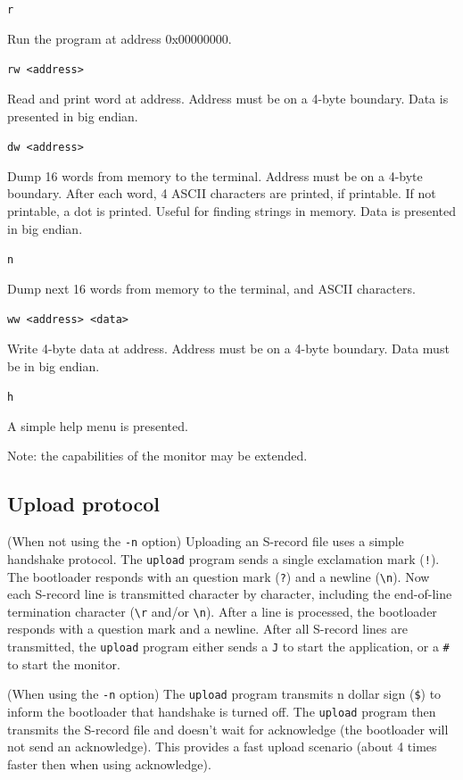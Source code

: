 \documentclass[12pt]{article}
\begin{document}
\lstinline|r|

Run the program at address 0x00000000.

\lstinline|rw <address>|

Read and print word at address. Address must be on a 4-byte boundary. Data is presented in big endian.

\lstinline|dw <address>|

Dump 16 words from memory to the terminal. Address must be on a 4-byte boundary. After each word, 4 ASCII characters are printed, if printable. If not printable, a dot is printed. Useful for finding strings in memory. Data is presented in big endian.

\lstinline|n|

Dump next 16 words from memory to the terminal, and ASCII characters.

\lstinline|ww <address> <data>|

Write 4-byte data at address. Address must be on a 4-byte boundary. Data must be in big endian.

\lstinline|h|

A simple help menu is presented.

Note: the capabilities of the monitor may be extended.

\subsection{Upload protocol}
(When not using the \lstinline|-n| option) Uploading an S-record file uses a simple handshake protocol. The \lstinline|upload| program sends a single exclamation mark (\lstinline|!|). The bootloader responds with an question mark (\lstinline|?|) and a newline (\lstinline|\n|). Now each S-record line is transmitted character by character, including the end-of-line termination character (\lstinline|\r| and/or \lstinline|\n|). After a line is processed, the bootloader responds with a question mark and a newline. After all S-record lines are transmitted, the \lstinline|upload| program either sends a \lstinline|J| to start the application, or a \lstinline|#| to start the monitor.

(When using the \lstinline|-n| option) The \lstinline|upload| program transmits n dollar sign (\lstinline|$|) to inform the bootloader that handshake is turned off. The \lstinline|upload| program then transmits the S-record file and doesn't wait for acknowledge (the bootloader will not send an acknowledge). This provides a fast upload scenario (about 4 times faster then when using acknowledge).
\end{document}

